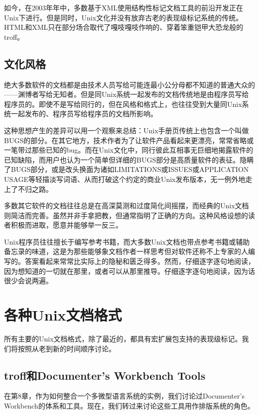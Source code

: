 \documentclass[12pt,oneside]{book}
\begin{document}
如今，在2003年年中，多数基于XML使用结构性标记文档工具的前沿开发正在Unix下进行。但是同时，Unix文化并没有放弃古老的表现级标记系统的传统。HTML和XML只在部分场合取代了嘎吱嘎吱作响的、穿着笨重铠甲大恐龙般的troff。

\subsection{文化风格}
绝大多数软件的文档都是由技术人员写给可能连最小公分母都不知道的普通大众的——渊博者写给无知者。但是同Unix系统一起发布的文档传统地是由程序员写给程序员的。即使不是写给同行的，但在风格和格式上，也往往受到大量同Unix系统一起发布的、程序员写给程序员的文档所影响。

这种思想产生的差异可以用一个观察来总结：Unix手册页传统上也包含一个叫做BUGS的部分。在其它地方，技术作者为了让软件产品看起来更漂亮，常常省略或一笔带过那些已知的bug。而在Unix文化中，同行彼此互相事无巨细地揭露软件的已知缺陷，而用户也认为一个简单但详细的BUGS部分是高质量软件的表征。隐瞒了BUGS部分，或是改头换面为诸如LIMITATIONS或ISSUES或APPLICATION USAGE等轻描淡写词语、从而打破这个约定的商业Unix发布版本，无一例外地走上了不归之路。

多数其它软件的文档往往总是在高深莫测和过度简化间摇摆，而经典的Unix文档则简洁而完善。虽然并非手拿把教，但通常指明了正确的方向。这种风格设想的读者积极而进取，愿意并能够举一反三。

Unix程序员往往擅长于编写参考书籍，而大多数Unix文档也带点参考书籍或辅助备忘录的味道，这是为那些能够象文档作者一样思考但对软件还称不上专家的人编写的。答案看起来常常比实际上的隐秘和匮乏得多。然而，仔细逐字逐句地阅读，因为想知道的一切就在那里，或者可以从那里推导。仔细逐字逐句地阅读，因为话很少会说两遍。

\section{各种Unix文档格式}
所有主要的Unix文档格式，除了最近的，都具有宏扩展包支持的表现级标记。我们将按照从老到新的时间顺序讨论。

\subsection{troff和Documenter's Workbench Tools}
在第8章，作为如何整合一个多微型语言系统的实例，我们讨论过Documenter's Workbench的体系和工具。现在，我们转过来讨论这些工具用作排版系统的角色。
\end{document}
